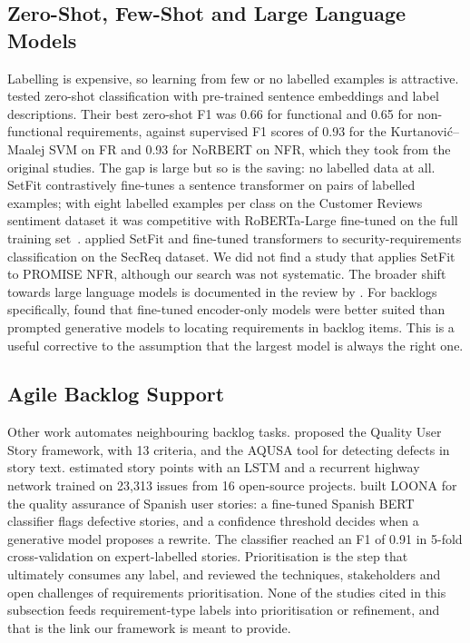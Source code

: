 \documentclass[conference,10pt,letterpaper]{IEEEtran}
\begin{document}
\subsection{Zero-Shot, Few-Shot and Large Language Models}
Labelling is expensive, so learning from few or no labelled examples is attractive. \textcite{alhoshan2023} tested zero-shot classification with pre-trained sentence embeddings and label descriptions. Their best zero-shot F1 was 0.66 for functional and 0.65 for non-functional requirements, against supervised F1 scores of 0.93 for the Kurtanović–Maalej SVM on FR and 0.93 for NoRBERT on NFR, which they took from the original studies. The gap is large but so is the saving: no labelled data at all. SetFit contrastively fine-tunes a sentence transformer on pairs of labelled examples; with eight labelled examples per class on the Customer Reviews sentiment dataset it was competitive with RoBERTa-Large fine-tuned on the full training set~\cite{tunstall2022setfit}. \Textcite{petrillo2025} applied SetFit and fine-tuned transformers to security-requirements classification on the SecReq dataset. We did not find a study that applies SetFit to PROMISE NFR, although our search was not systematic. The broader shift towards large language models is documented in the review by \textcite{hou2024llm4se}. For backlogs specifically, \textcite{vancan2025} found that fine-tuned encoder-only models were better suited than prompted generative models to locating requirements in backlog items. This is a useful corrective to the assumption that the largest model is always the right one.

\subsection{Agile Backlog Support}
Other work automates neighbouring backlog tasks. \textcite{lucassen2016qus} proposed the Quality User Story framework, with 13 criteria, and the AQUSA tool for detecting defects in story text. \textcite{choetkiertikul2019} estimated story points with an LSTM and a recurrent highway network trained on 23,313 issues from 16 open-source projects. \textcite{mejia2026loona} built LOONA for the quality assurance of Spanish user stories: a fine-tuned Spanish BERT classifier flags defective stories, and a confidence threshold decides when a generative model proposes a rewrite. The classifier reached an F1 of 0.91 in 5-fold cross-validation on expert-labelled stories. Prioritisation is the step that ultimately consumes any label, and \textcite{hujainah2018} reviewed the techniques, stakeholders and open challenges of requirements prioritisation. None of the studies cited in this subsection feeds requirement-type labels into prioritisation or refinement, and that is the link our framework is meant to provide.
\end{document}
